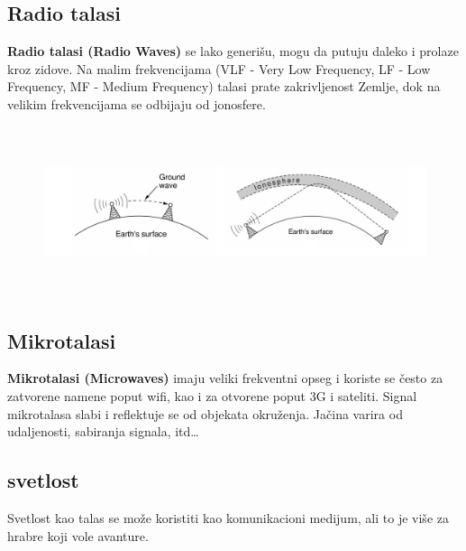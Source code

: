 \documentclass[a4paper]{article}
\begin{document}
        \subsection{Radio talasi}
        \textbf{Radio talasi (Radio Waves)} se lako generišu, mogu da putuju daleko i prolaze kroz zidove. Na malim 
        frekvencijama (VLF - Very Low Frequency, LF - Low Frequency, MF - Medium Frequency) talasi prate zakrivljenost 
        Zemlje, dok na velikim frekvencijama se odbijaju od jonosfere.
        \begin{figure}[H]
            \begin{center}
                \includegraphics[width=125mm,height=50mm]{Slike/radio_talasi.png}
            \end{center}
        \end{figure}
        \subsection{Mikrotalasi}
        \textbf{Mikrotalasi (Microwaves)} imaju veliki frekventni opseg i koriste se često za zatvorene namene
        poput wifi, kao i za otvorene poput 3G i sateliti. Signal mikrotalasa slabi i reflektuje
        se od objekata okruženja. Jačina varira od udaljenosti, sabiranja signala, itd\dots
        \subsection{svetlost}
        Svetlost kao talas se može koristiti kao komunikacioni medijum, ali to je više za hrabre
        koji vole avanture.
\end{document}

